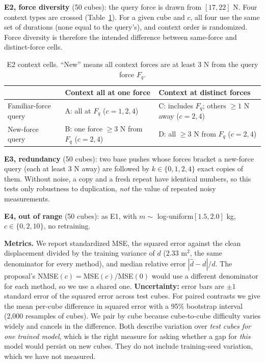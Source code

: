 \documentclass{article}
\begin{document}
\textbf{E2, force diversity} (50 cubes): the query force is drawn from $[17,22]$ N. Four context types are crossed (Table~\ref{tab:e2design}). For a given cube and $c$, all four use the same set of durations (none equal to the query's), and context order is randomized. Force diversity is therefore the intended difference between same-force and distinct-force cells.
\begin{table}[t]
\centering\footnotesize
\caption{E2 context cells. ``New'' means all context forces are at least 3 N from the query force $F_q$.}
\label{tab:e2design}
\setlength{\tabcolsep}{3pt}
\begin{tabular}{lll}
\toprule
 & Context all at one force & Context at distinct forces\\
\midrule
Familiar-force query & A: all at $F_q$ ($c=1,2,4$) & C: includes $F_q$; others $\ge1$ N away ($c=2,4$)\\
New-force query & B: one force $\ge3$ N from $F_q$ ($c=2,4$) & D: all $\ge3$ N from $F_q$ ($c=2,4$)\\
\bottomrule
\end{tabular}
\end{table}

\textbf{E3, redundancy} (50 cubes): two base pushes whose forces bracket a new-force query (each at least 3 N away) are followed by $k\in\{0,1,2,4\}$ exact copies of them. Without noise, a copy and a fresh repeat have identical numbers, so this tests only robustness to duplication, \emph{not} the value of repeated noisy measurements.

\textbf{E4, out of range} (50 cubes): as E1, with $m\sim$ log-uniform$[1.5,2.0]$ kg, $c\in\{0,2,10\}$, no retraining.

\textbf{Metrics.} We report standardized MSE, the squared error against the clean displacement divided by the training variance of $d$ ($2.33$ m$^2$, the same denominator for every method), and median relative error $|\hat d-d|/d$. The proposal's NMSE$(c)=$MSE$(c)/$MSE$(0)$ would use a different denominator for each method, so we use a shared one. \textbf{Uncertainty:} error bars are $\pm1$ standard error of the squared error across test cubes. For paired contrasts we give the mean per-cube difference in squared error with a 95\% bootstrap interval (2,000 resamples of cubes). We pair by cube because cube-to-cube difficulty varies widely and cancels in the difference. Both describe variation over \emph{test cubes for one trained model}, which is the right measure for asking whether a gap for \emph{this} model would persist on new cubes. They do not include training-seed variation, which we have not measured.
\end{document}
